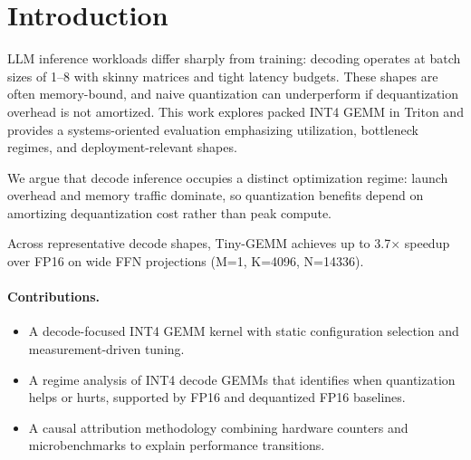 \section{Introduction}
LLM inference workloads differ sharply from training: decoding operates at batch
sizes of 1--8 with skinny matrices and tight latency budgets. These shapes are
often memory-bound, and naive quantization can underperform if dequantization
overhead is not amortized. This work explores packed INT4 GEMM in Triton and
provides a systems-oriented evaluation emphasizing utilization, bottleneck
regimes, and deployment-relevant shapes.

We argue that decode inference occupies a distinct optimization regime: launch
overhead and memory traffic dominate, so quantization benefits depend on
amortizing dequantization cost rather than peak compute.

Across representative decode shapes, Tiny-GEMM achieves up to 3.7$\times$
speedup over FP16 on wide FFN projections (M=1, K=4096, N=14336).

\paragraph{Contributions.}
\begin{itemize}[leftmargin=*,itemsep=0.2em,topsep=0.2em]
  \item A decode-focused INT4 GEMM kernel with static configuration selection
        and measurement-driven tuning.
  \item A regime analysis of INT4 decode GEMMs that identifies when quantization
        helps or hurts, supported by FP16 and dequantized FP16 baselines.
  \item A causal attribution methodology combining hardware counters and
        microbenchmarks to explain performance transitions.
\end{itemize}
